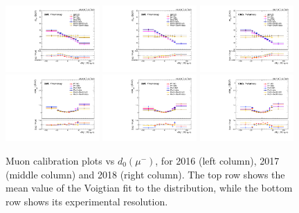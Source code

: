 \begin{figure}[!htb]
      \centering
      \captionsetup{justification=justified}
      \includegraphics[width=0.32\textwidth]{pics/muon_corr/muon_cal/2016/muN_d0_rebin_summary_mean.pdf}
      \includegraphics[width=0.32\textwidth]{pics/muon_corr/muon_cal/2017/muN_d0_rebin_summary_mean.pdf}
      \includegraphics[width=0.32\textwidth]{pics/muon_corr/muon_cal/2018/muN_d0_rebin_summary_mean.pdf}
      \includegraphics[width=0.32\textwidth]{pics/muon_corr/muon_cal/2016/muN_d0_rebin_summary_reso.pdf}
      \includegraphics[width=0.32\textwidth]{pics/muon_corr/muon_cal/2017/muN_d0_rebin_summary_reso.pdf}
      \includegraphics[width=0.32\textwidth]{pics/muon_corr/muon_cal/2018/muN_d0_rebin_summary_reso.pdf}
      \caption{Muon calibration plots vs $d_0(\mu^{-})$, for 2016 (left column), 2017 (middle column) and 2018 (right column).
               The top row shows the mean value of the Voigtian fit to the \mmm distribution, 
               while the bottom row shows its experimental resolution.}
      \label{fig:mucal_muN_d0}
\end{figure}